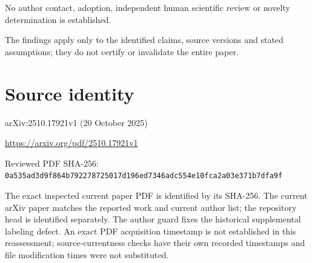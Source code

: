\documentclass[11pt]{article}
\begin{document}
No author contact, adoption, independent human scientific review or novelty determination is established.\par

The findings apply only to the identified claims, source versions and stated assumptions; they do not certify or invalidate the entire paper.\par

\section*{Source identity}

arXiv:2510.17921v1 (20 October 2025)

\url{https://arxiv.org/pdf/2510.17921v1}

Reviewed PDF SHA-256: \nolinkurl{0a535ad3d9f864b792278725017d196ed7346adc554e10fca2a03e371b7dfa9f}

The exact inspected current paper PDF is identified by its SHA-256. The current arXiv paper matches the reported work and current author list; the repository head is identified separately. The author guard fixes the historical supplemental labeling defect. An exact PDF acquisition timestamp is not established in this reassessment; source-currentness checks have their own recorded timestamps and file modification times were not substituted.
\end{document}
